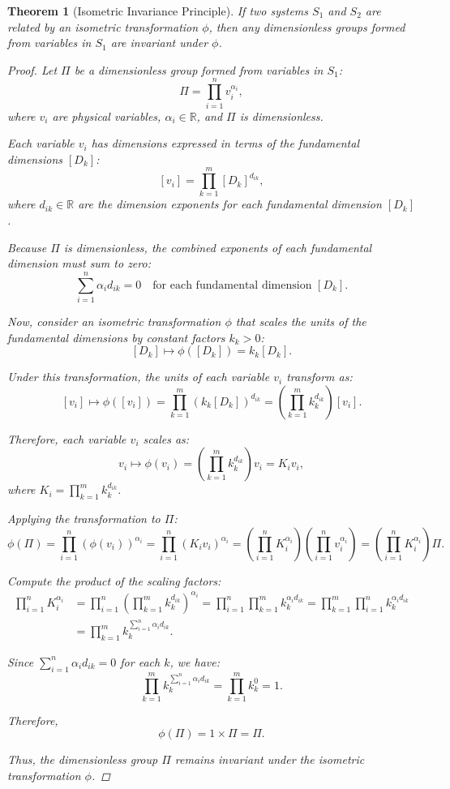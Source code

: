 \documentclass{article}
\newtheorem{theorem}{Theorem}[section]
\theoremstyle{definition}
\theoremstyle{remark}
\begin{document}
	\begin{theorem}[Isometric Invariance Principle]
		If two systems $S_1$ and $S_2$ are related by an isometric transformation $\phi$, then any dimensionless groups formed from variables in $S_1$ are invariant under $\phi$.
		
	\begin{proof}
		Let $\Pi$ be a dimensionless group formed from variables in $S_1$:
		\[
		\Pi = \prod_{i=1}^n v_i^{\alpha_i},
		\]
		where $v_i$ are physical variables, $\alpha_i \in \mathbb{R}$, and $\Pi$ is dimensionless.
		
		Each variable $v_i$ has dimensions expressed in terms of the fundamental dimensions $[D_k]$:
		\[
		[v_i] = \prod_{k=1}^m [D_k]^{d_{ik}},
		\]
		where $d_{ik} \in \mathbb{R}$ are the dimension exponents for each fundamental dimension $[D_k]$.
		
		Because $\Pi$ is dimensionless, the combined exponents of each fundamental dimension must sum to zero:
		\[
		\sum_{i=1}^n \alpha_i d_{ik} = 0 \quad \text{for each fundamental dimension } [D_k].
		\]
		
		Now, consider an isometric transformation $\phi$ that scales the units of the fundamental dimensions by constant factors $k_k > 0$:
		\[
		[D_k] \mapsto \phi([D_k]) = k_k [D_k].
		\]
		
		Under this transformation, the units of each variable $v_i$ transform as:
		\[
		[v_i] \mapsto \phi([v_i]) = \prod_{k=1}^m (k_k [D_k])^{d_{ik}} = \left( \prod_{k=1}^m k_k^{d_{ik}} \right) [v_i].
		\]
		
		Therefore, each variable $v_i$ scales as:
		\[
		v_i \mapsto \phi(v_i) = \left( \prod_{k=1}^m k_k^{d_{ik}} \right) v_i = K_i v_i,
		\]
		where $K_i = \prod_{k=1}^m k_k^{d_{ik}}$.
		
		Applying the transformation to $\Pi$:
		\[
		\phi(\Pi) = \prod_{i=1}^n \left( \phi(v_i) \right)^{\alpha_i} = \prod_{i=1}^n \left( K_i v_i \right)^{\alpha_i} = \left( \prod_{i=1}^n K_i^{\alpha_i} \right) \left( \prod_{i=1}^n v_i^{\alpha_i} \right) = \left( \prod_{i=1}^n K_i^{\alpha_i} \right) \Pi.
		\]
		
		Compute the product of the scaling factors:
		\begin{align*}
			\prod_{i=1}^n K_i^{\alpha_i} &= \prod_{i=1}^n \left( \prod_{k=1}^m k_k^{d_{ik}} \right)^{\alpha_i} = \prod_{i=1}^n \prod_{k=1}^m k_k^{\alpha_i d_{ik}} = \prod_{k=1}^m \prod_{i=1}^n k_k^{\alpha_i d_{ik}} \\
			&= \prod_{k=1}^m k_k^{\sum_{i=1}^n \alpha_i d_{ik}}.
		\end{align*}
		
		Since $\sum_{i=1}^n \alpha_i d_{ik} = 0$ for each $k$, we have:
		\[
		\prod_{k=1}^m k_k^{\sum_{i=1}^n \alpha_i d_{ik}} = \prod_{k=1}^m k_k^{0} = 1.
		\]
		
		Therefore,
		\[
		\phi(\Pi) = 1 \times \Pi = \Pi.
		\]
		
		Thus, the dimensionless group $\Pi$ remains invariant under the isometric transformation $\phi$.
	\end{proof}
	\end{theorem}
	
\end{document}
